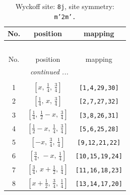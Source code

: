\documentclass[fleqn,8pt]{jsarticle}
\begin{document}
\begin{longtable}{ccc}
\caption{Wyckoff site: {\tt 8j}, site symmetry: {\tt m'2m'.}}
 \\
 \hline \hline
No. & position & mapping \\ \hline \endfirsthead

\multicolumn{2}{l}{\tablename\ \thetable{}} \\
 \hline \hline
No. & position & mapping \\ \hline \endhead

 \hline \hline
\multicolumn{2}{r}{\footnotesize\it continued ...} \\ \endfoot

 \hline \hline
\multicolumn{2}{r}{} \\ \endlastfoot

1 & $\left[ x,\, \frac{1}{4},\, \frac{3}{4} \right]$ & {\tt [1,4,29,30]} \\ \hline
2 & $\left[ \frac{1}{4},\, x,\, \frac{3}{4} \right]$ & {\tt [2,7,27,32]} \\ \hline
3 & $\left[ \frac{1}{4},\, \frac{1}{2} - x,\, \frac{3}{4} \right]$ & {\tt [3,8,26,31]} \\ \hline
4 & $\left[ \frac{1}{2} - x,\, \frac{1}{4},\, \frac{3}{4} \right]$ & {\tt [5,6,25,28]} \\ \hline
5 & $\left[ - x,\, \frac{3}{4},\, \frac{1}{4} \right]$ & {\tt [9,12,21,22]} \\ \hline
6 & $\left[ \frac{3}{4},\, - x,\, \frac{1}{4} \right]$ & {\tt [10,15,19,24]} \\ \hline
7 & $\left[ \frac{3}{4},\, x + \frac{1}{2},\, \frac{1}{4} \right]$ & {\tt [11,16,18,23]} \\ \hline
8 & $\left[ x + \frac{1}{2},\, \frac{3}{4},\, \frac{1}{4} \right]$ & {\tt [13,14,17,20]} \\
\end{longtable}
\renewcommand{\arraystretch}{1.2}
\end{document}
